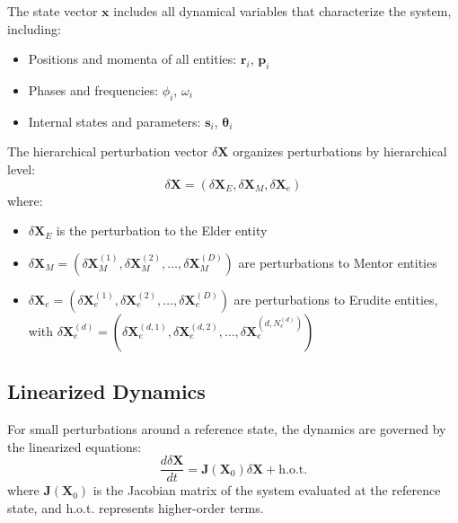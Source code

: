 The state vector $\mathbf{x}$ includes all dynamical variables that characterize the system, including:
\begin{itemize}
    \item Positions and momenta of all entities: $\mathbf{r}_i$, $\mathbf{p}_i$
    \item Phases and frequencies: $\phi_i$, $\omega_i$
    \item Internal states and parameters: $\mathbf{s}_i$, $\boldsymbol{\theta}_i$
\end{itemize}

\begin{definition}
The hierarchical perturbation vector $\delta\mathbf{X}$ organizes perturbations by hierarchical level:
\begin{equation}
\delta\mathbf{X} = (\delta\mathbf{X}_E, \delta\mathbf{X}_M, \delta\mathbf{X}_e)
\end{equation}
where:
\begin{itemize}
    \item $\delta\mathbf{X}_E$ is the perturbation to the Elder entity
    \item $\delta\mathbf{X}_M = (\delta\mathbf{X}_M^{(1)}, \delta\mathbf{X}_M^{(2)}, \ldots, \delta\mathbf{X}_M^{(D)})$ are perturbations to Mentor entities
    \item $\delta\mathbf{X}_e = (\delta\mathbf{X}_e^{(1)}, \delta\mathbf{X}_e^{(2)}, \ldots, \delta\mathbf{X}_e^{(D)})$ are perturbations to Erudite entities, with $\delta\mathbf{X}_e^{(d)} = (\delta\mathbf{X}_e^{(d,1)}, \delta\mathbf{X}_e^{(d,2)}, \ldots, \delta\mathbf{X}_e^{(d,N_e^{(d)})})$
\end{itemize}
\end{definition}

\subsection{Linearized Dynamics}

\begin{theorem}
For small perturbations around a reference state, the dynamics are governed by the linearized equations:
\begin{equation}
\frac{d\delta\mathbf{X}}{dt} = \mathbf{J}(\mathbf{X}_0) \delta\mathbf{X} + \text{h.o.t.}
\end{equation}
where $\mathbf{J}(\mathbf{X}_0)$ is the Jacobian matrix of the system evaluated at the reference state, and h.o.t. represents higher-order terms.
\end{theorem}

